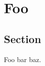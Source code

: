 \documentclass[11pt,a4paper]{book}
\begin{document}
\chapter{Foo}

\section{Section}

Foo bar baz.


\end{document}
